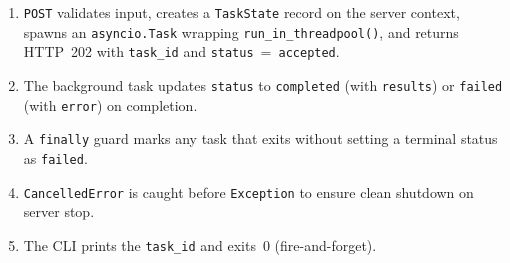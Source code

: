 \documentclass[a4paper,10pt]{article}
\newcommand{\field}[1]{\texttt{#1}}
\begin{document}
\begin{enumerate}
  \item \texttt{POST} validates input, creates a \texttt{TaskState}
    record on the server context, spawns an \texttt{asyncio.Task}
    wrapping \texttt{run\_in\_threadpool()}, and returns HTTP~202
    with \field{task\_id} and \field{status}~=~\texttt{accepted}.
  \item The background task updates \field{status} to
    \texttt{completed} (with \field{results}) or \texttt{failed}
    (with \field{error}) on completion.
  \item A \texttt{finally} guard marks any task that exits without
    setting a terminal status as \texttt{failed}.
  \item \texttt{CancelledError} is caught before \texttt{Exception}
    to ensure clean shutdown on server stop.
  \item The CLI prints the \field{task\_id} and exits~0 (fire-and-forget).
\end{enumerate}
\end{document}
